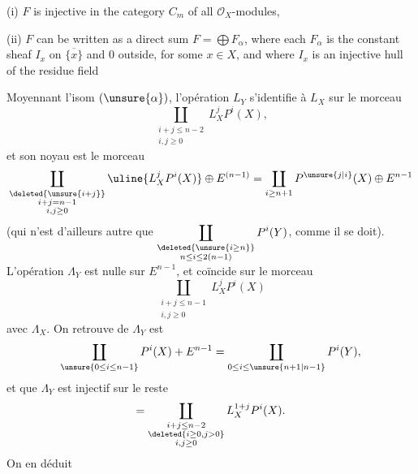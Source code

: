 (i) $F$ is injective in the category $C_m$ of all $\mathcal O_X$-modules,

(ii) $F$ can be written as a direct sum $F=\bigoplus F_\alpha$, where each $F_\alpha$ is the constant sheaf $I_x$ on $\overline{\{x\}}$ and $0$ outside, for some $x\in X$, and where $I_x$ is an injective hull of the residue field

 Moyennant l'isom $(\unsure{\alpha})$, l'opération $L_Y$ s'identifie à $L_X$ sur le morceau
\[
\coprod_{\substack{i+j\leq n-2\\i,j\geq0}}L_X^jP^i(X),
\]
et son noyau est le morceau
\[
\coprod_{\substack{\deleted{\unsure{i+j}}\\i+j=n-1\\i,j\geq0}}\uline{L_X^jP^i(X)}\oplus E^{(n-1)}
=\coprod_{i\geq n+1}P^{\unsure{j|i}}(X)\oplus E^{n-1}
\]
(qui n'est d'ailleurs autre que $\displaystyle\coprod_{\substack{\deleted{\unsure{i\geq n}}\\n\leq i\leq2(n-1)}}P^i(Y)$, comme il se doit). L'opération $\Lambda_Y$ est nulle sur $E^{n-1}$, et coïncide sur le morceau
\[\coprod_{\substack{i+j\leq n-1\\i,j\geq0}}L_X^jP^i(X)\]
avec $\Lambda_X$. On retrouve  de $\Lambda_Y$  est
\[
\coprod_{\unsure{0\leq i\leq n-1}}P^i(X)+E^{n-1}=\coprod_{0\leq i\leq\unsure{n+1|n-1}}P^i(Y),
\]
 et que $\Lambda_Y$ est injectif sur le reste
\[
=\coprod_{\substack{i+j\leq n-2\\\deleted{i\geq0,j>0}\\i,j\geq0}}L_X^{1+j}P^i(X).
\]
On en déduit

